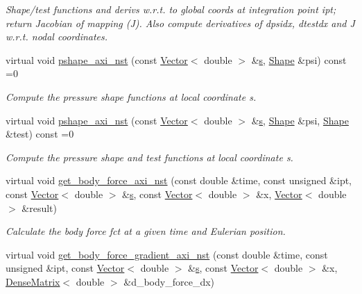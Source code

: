 \begin{DoxyCompactItemize}
\begin{DoxyCompactList}\small\item\em Shape/test functions and derivs w.\+r.\+t. to global coords at integration point ipt; return Jacobian of mapping (J). Also compute derivatives of dpsidx, dtestdx and J w.\+r.\+t. nodal coordinates. \end{DoxyCompactList}\item 
virtual void \hyperlink{classoomph_1_1GeneralisedNewtonianAxisymmetricNavierStokesEquations_a45e6df6b18daa524c32659572470cc7b}{pshape\+\_\+axi\+\_\+nst} (const \hyperlink{classoomph_1_1Vector}{Vector}$<$ double $>$ \&\hyperlink{cfortran_8h_ab7123126e4885ef647dd9c6e3807a21c}{s}, \hyperlink{classoomph_1_1Shape}{Shape} \&psi) const =0
\begin{DoxyCompactList}\small\item\em Compute the pressure shape functions at local coordinate s. \end{DoxyCompactList}\item 
virtual void \hyperlink{classoomph_1_1GeneralisedNewtonianAxisymmetricNavierStokesEquations_a278087089b3cd5b354b57b997ce7a224}{pshape\+\_\+axi\+\_\+nst} (const \hyperlink{classoomph_1_1Vector}{Vector}$<$ double $>$ \&\hyperlink{cfortran_8h_ab7123126e4885ef647dd9c6e3807a21c}{s}, \hyperlink{classoomph_1_1Shape}{Shape} \&psi, \hyperlink{classoomph_1_1Shape}{Shape} \&test) const =0
\begin{DoxyCompactList}\small\item\em Compute the pressure shape and test functions at local coordinate s. \end{DoxyCompactList}\item 
virtual void \hyperlink{classoomph_1_1GeneralisedNewtonianAxisymmetricNavierStokesEquations_a99ba0574a9a918553ee96254ea743178}{get\+\_\+body\+\_\+force\+\_\+axi\+\_\+nst} (const double \&time, const unsigned \&ipt, const \hyperlink{classoomph_1_1Vector}{Vector}$<$ double $>$ \&\hyperlink{cfortran_8h_ab7123126e4885ef647dd9c6e3807a21c}{s}, const \hyperlink{classoomph_1_1Vector}{Vector}$<$ double $>$ \&x, \hyperlink{classoomph_1_1Vector}{Vector}$<$ double $>$ \&result)
\begin{DoxyCompactList}\small\item\em Calculate the body force fct at a given time and Eulerian position. \end{DoxyCompactList}\item 
virtual void \hyperlink{classoomph_1_1GeneralisedNewtonianAxisymmetricNavierStokesEquations_afa05d1b987360f333b38aea67991f732}{get\+\_\+body\+\_\+force\+\_\+gradient\+\_\+axi\+\_\+nst} (const double \&time, const unsigned \&ipt, const \hyperlink{classoomph_1_1Vector}{Vector}$<$ double $>$ \&\hyperlink{cfortran_8h_ab7123126e4885ef647dd9c6e3807a21c}{s}, const \hyperlink{classoomph_1_1Vector}{Vector}$<$ double $>$ \&x, \hyperlink{classoomph_1_1DenseMatrix}{Dense\+Matrix}$<$ double $>$ \&d\+\_\+body\+\_\+force\+\_\+dx)

\end{DoxyCompactItemize}
